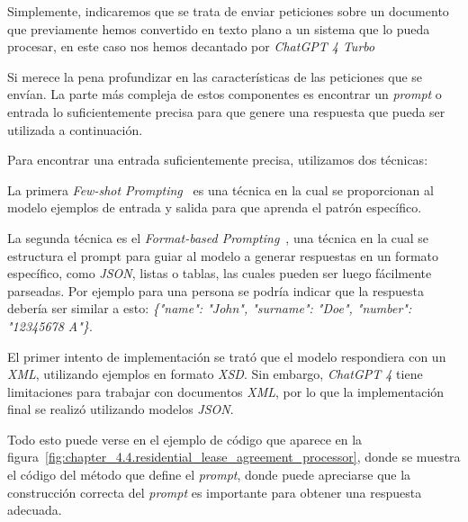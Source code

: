 Simplemente, indicaremos que se trata de enviar peticiones sobre un documento que previamente hemos convertido en texto
plano a un sistema que lo pueda procesar, en este caso nos hemos decantado por \textit{ChatGPT 4 Turbo}~
\cite{url_openai_gpt4}

Si merece la pena profundizar en las características de las peticiones que se envían.
La parte más compleja de estos componentes es encontrar un \textit{prompt} o entrada lo suficientemente precisa para que
genere una respuesta que pueda ser utilizada a continuación.

Para encontrar una entrada suficientemente precisa, utilizamos dos técnicas:

La primera \textit{Few-shot Prompting}~\cite{article_few_shot_prompting} es una técnica en la cual se proporcionan
al modelo ejemplos de entrada y salida para que aprenda el patrón específico.

La segunda técnica es el \textit{Format-based Prompting}~\cite{article_format_based_prompting}, una técnica en la
cual se estructura el prompt para guiar al modelo a generar respuestas en un formato específico, como \textit{JSON},
listas o tablas, las cuales pueden ser luego fácilmente parseadas.
Por ejemplo para una persona se podría indicar que la respuesta debería ser similar a esto:
\textit{\{"name": "John", "surname": "Doe", "number": "12345678 A"\}}.

El primer intento de implementación se trató que el modelo respondiera con un \textit{XML}, utilizando ejemplos en
formato \textit{XSD}.
Sin embargo, \textit{ChatGPT 4} tiene limitaciones para trabajar con documentos \textit{XML}, por lo que la
implementación final se realizó utilizando modelos \textit{JSON}.

Todo esto puede verse en el ejemplo de código que aparece en la
figura~\ref{fig:chapter_4.4.residential_lease_agreement_processor}, donde se muestra el código del método que define el
\textit{prompt}, donde puede apreciarse que la construcción correcta del \textit{prompt} es importante para obtener
una respuesta adecuada.


